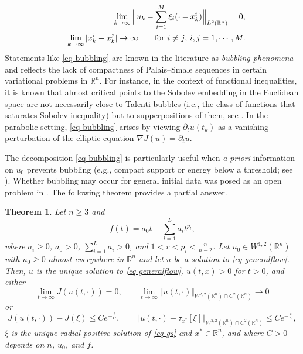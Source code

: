 \documentclass[11pt,letterpaper,reqno]{amsart}
\newcommand{\R}{\mathbb{R}}
\theoremstyle{plain}%
\newtheorem{theorem}{Theorem}[section]
\theoremstyle{definition}
\numberwithin{equation}{section}
\numberwithin{figure}{section}
\begin{document}
\begin{eqnarray}\notag
   &&\lim_{k\to \infty} \Big\Vert u_k  -\sum_{i=1}^M \xi_i(\cdot - x_k^i) \Big \Vert_{L^2(\R^n)} =0,\\ \label{eq bubbling}
   &&\lim_{k\to \infty} |x^i_k -x^j_k| \to \infty \qquad \mbox{for $i\neq j$, $i,j =1, \cdots, M.$}
\end{eqnarray}
Statements like \eqref{eq bubbling} are known in the literature as \emph{bubbling phenomena} and reflects the lack of compactness of Palais--Smale sequences in certain variational problems in $\R^n$. For instance, in the context of functional inequalities, it is known that almost critical points to the Sobolev embedding in the Euclidean space are not necessarily close to Talenti bubbles (i.e., the class of functions that saturates Sobolev inequality) but to supperpositions of them, see \cite{struwe1984global}. In the parabolic setting, \eqref{eq bubbling} arises by viewing $\partial_t u(t_k)$ as a vanishing perturbation of the elliptic equation $\nabla J(u) = \partial_t u$.

The decomposition \eqref{eq bubbling} is particularly useful when \emph{a priori} information on $u_0$ prevents bubbling (e.g., compact support or energy below a threshold; see \cite{feireisl1997long, feireisl1997threshold, bonforte2024asymptotic}). Whether bubbling may occur for general initial data was posed as an open problem in \cite{feireisl1997long}. The following theorem provides a partial answer.

\begin{theorem}\label{thm1}
Let $n\geq 3$ and \begin{equation}\label{eq tildef}
f(t) = a_0t -\sum_{l=1}^La_i t^{p_l},  
\end{equation}
where $a_i\geq 0$, $a_0>0$, $\sum_{i=1}^La_i>0$, and $1<r<p_i < \frac{n}{n-2}$. Let $u_0 \in W^{1,2}(\R^n)$ with $u_0 \geq 0$ almost everywhere in $\R^n$ and let $u$ be a solution to \eqref{eq generalflow}. Then, $u$ is the unique solution to \eqref{eq generalflow}, $u(t,x)>0$ for $t>0$, and either \begin{equation}\label{eq zerop}
 \lim_{t\to \infty}J(u(t, \cdot))=0, \qquad  \lim_{t\to \infty}\Vert u( t, \cdot)\Vert_{W^{2,2}(\R^n)\cap C^2(\R^n)} \to 0 
\end{equation}
or
\begin{equation}\label{eq nonzero}
   J(u(t, \cdot))-J(\xi) \leq C e^{-\frac{t}{C}}, \qquad \Vert u(t, \cdot)-\tau_{x^*}[\xi]\Vert_{W^{2,2}(\R^n)\cap C^2(\R^n)} \leq C e^{-\frac{t}{C}},
\end{equation}
$\xi$ is the unique radial positive solution of \eqref{eq gs} and $x^* \in \R^n$, and where $C>0$ depends on $n$, $u_0$, and $f$.
\end{theorem}
\end{document}
